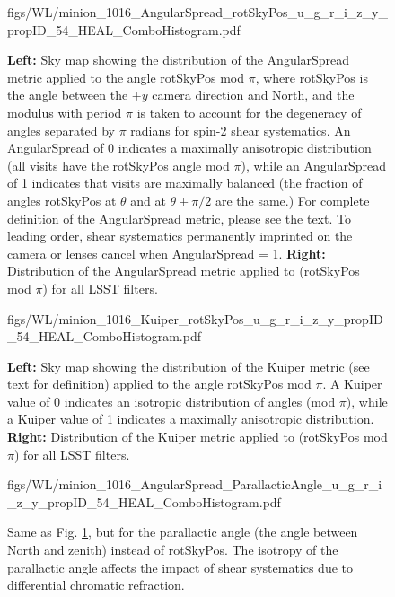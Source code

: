 \begin{figure}[tbh!]
        {figs/WL/minion_1016_AngularSpread_rotSkyPos_u_g_r_i_z_y_propID_54_HEAL_ComboHistogram.pdf}
\caption{\textbf{Left:} Sky map showing the distribution of the AngularSpread metric applied to the
    angle rotSkyPos mod $\pi$, where rotSkyPos is the angle between the $+y$ camera direction and
    North, and the modulus with period $\pi$ is taken to account for the degeneracy of angles
    separated by $\pi$ radians for spin-2 shear systematics.  An AngularSpread of 0 indicates a
    maximally anisotropic distribution (all visits have the rotSkyPos angle mod $\pi$), while an
    AngularSpread of 1 indicates that visits are maximally balanced (the fraction of angles
    rotSkyPos at $\theta$ and at $\theta + \pi/2$ are the same.)  For complete definition of the
    AngularSpread metric, please see the text.  To leading order, shear systematics permanently
    imprinted on the camera or lenses cancel when AngularSpread = 1.  \textbf{Right:} Distribution
    of the AngularSpread metric applied to (rotSkyPos mod $\pi$) for all LSST filters.}
\label{fig:WL_AngularSpread_rotSkyPos}
\end{figure}

\begin{figure}[tbh!]
        {figs/WL/minion_1016_Kuiper_rotSkyPos_u_g_r_i_z_y_propID_54_HEAL_ComboHistogram.pdf}
\caption{\textbf{Left:} Sky map showing the distribution of the Kuiper metric (see text for
    definition) applied to the angle rotSkyPos mod $\pi$.  A Kuiper value of 0 indicates an
    isotropic distribution of angles (mod $\pi$), while a Kuiper value of 1 indicates a maximally
    anisotropic distribution. \textbf{Right:} Distribution of the Kuiper metric applied to
    (rotSkyPos mod $\pi$) for all LSST filters.}
\label{fig:WL_Kuiper_rotSkyPos}
\end{figure}


\begin{figure}[tbh!]
        {figs/WL/minion_1016_AngularSpread_ParallacticAngle_u_g_r_i_z_y_propID_54_HEAL_ComboHistogram.pdf}
\caption{Same as Fig. \ref{fig:WL_AngularSpread_rotSkyPos}, but for the parallactic angle (the angle
    between North and zenith) instead of rotSkyPos.  The isotropy of the parallactic angle affects
    the impact of shear systematics due to differential chromatic refraction.}
\label{fig:WL_AngularSpread_ParallacticAngle}
\end{figure}

